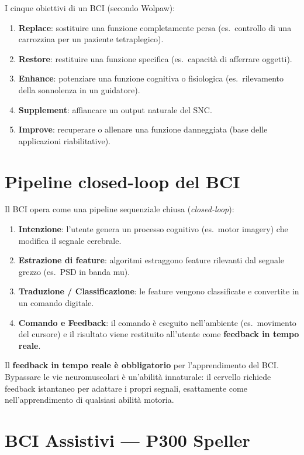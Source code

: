 I cinque obiettivi di un BCI (secondo Wolpaw):
\begin{enumerate}
    \item \textbf{Replace}: sostituire una funzione completamente persa (es.\ controllo di una carrozzina per un paziente tetraplegico).
    \item \textbf{Restore}: restituire una funzione specifica (es.\ capacità di afferrare oggetti).
    \item \textbf{Enhance}: potenziare una funzione cognitiva o fisiologica (es.\ rilevamento della sonnolenza in un guidatore).
    \item \textbf{Supplement}: affiancare un output naturale del SNC.
    \item \textbf{Improve}: recuperare o allenare una funzione danneggiata (base delle applicazioni riabilitative).
\end{enumerate}

\section{Pipeline closed-loop del BCI}

Il BCI opera come una pipeline sequenziale chiusa (\textit{closed-loop}):
\begin{enumerate}
    \item \textbf{Intenzione}: l'utente genera un processo cognitivo (es.\ motor imagery) che modifica il segnale cerebrale.
    \item \textbf{Estrazione di feature}: algoritmi estraggono feature rilevanti dal segnale grezzo (es.\ PSD in banda mu).
    \item \textbf{Traduzione / Classificazione}: le feature vengono classificate e convertite in un comando digitale.
    \item \textbf{Comando e Feedback}: il comando è eseguito nell'ambiente (es.\ movimento del cursore) e il risultato viene restituito all'utente come \textbf{feedback in tempo reale}.
\end{enumerate}

\begin{attenzione}[]
Il \textbf{feedback in tempo reale è obbligatorio} per l'apprendimento del BCI. Bypassare le vie neuromuscolari è un'abilità innaturale: il cervello richiede feedback istantaneo per adattare i propri segnali, esattamente come nell'apprendimento di qualsiasi abilità motoria.
\end{attenzione}

\section{BCI Assistivi — P300 Speller}


